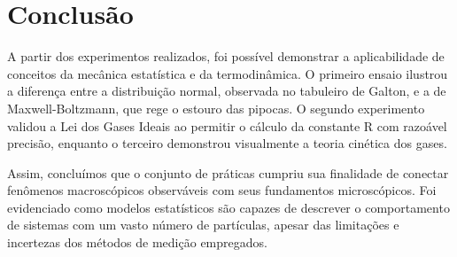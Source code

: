 \section{Conclusão} 
A partir dos experimentos realizados, foi possível demonstrar a aplicabilidade de conceitos da mecânica estatística e da termodinâmica. O primeiro ensaio ilustrou a diferença entre a distribuição normal, observada no tabuleiro de Galton, e a de Maxwell-Boltzmann, que rege o estouro das pipocas. O segundo experimento validou a Lei dos Gases Ideais ao permitir o cálculo da constante R com razoável precisão, enquanto o terceiro demonstrou visualmente a teoria cinética dos gases.

Assim, concluímos que o conjunto de práticas cumpriu sua finalidade de conectar fenômenos macroscópicos observáveis com seus fundamentos microscópicos. Foi evidenciado como modelos estatísticos são capazes de descrever o comportamento de sistemas com um vasto número de partículas, apesar das limitações e incertezas dos métodos de medição empregados.

